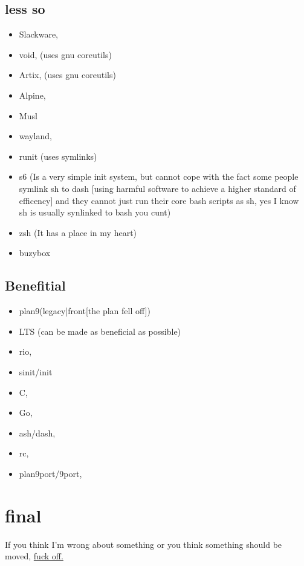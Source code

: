 \documentclass{article}
\begin{document}
\subsection{less so}
\begin{itemize}
	\item Slackware,
	\item void, (uses gnu coreutils)
	\item Artix, (uses gnu coreutils)
	\item Alpine,
	\item Musl
	\item wayland,
	\item runit (uses symlinks)
	\item s6 (Is a very simple init system, but cannot cope with the fact some people symlink sh to dash [using harmful software to achieve a higher standard of efficency] and they cannot just run their core bash scripts as sh, yes I know sh is usually synlinked to bash you cunt)
	\item zsh (It has a place in my heart)
	\item buzybox
\end{itemize}

\subsection{Benefitial}
\begin{itemize}
	\item plan9(legacy|front[the plan fell off])
	\item LTS (can be made as beneficial as possible)
	\item rio,
	\item sinit/init
	\item C,
	\item Go,
	\item ash/dash,
	\item rc,
	\item plan9port/9port,
\end{itemize}

\section{final}
If you think I'm wrong about something or you think something should be moved, \href{lordruskk@gmail.com}{fuck off.}
\end{document}

